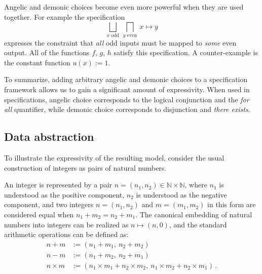 \documentclass[11pt,oneside]{book}
\theoremstyle{definition}
\begin{document}
Angelic and demonic choices become even more powerful
when they are used together.
For example the specification
\[
  \bigsqcup_{x \text{ odd}} \:
  \bigsqcap_{y \text{ even}} \:
  x \mapsto y
\]
expresses the constraint that \emph{all} odd inputs 
must be mapped to \emph{some} even output.
All of the functions $f$, $g$, $h$ satisfy this specification.
A counter-example is the constant function $u(x) := 1$.

To summarize,
adding arbitrary angelic and demonic choices
to a specification framework
allows us to gain a significant amount of expressivity.
When used in specifications,
angelic choice corresponds to
the logical conjunction and the \emph{for all} quantifier,
while demonic choice corresponds to
disjunction and \emph{there exists}.


\subsection{Data abstraction} \label{sec:fspec-ab} %

To illustrate the expressivity of the resulting model,
consider the usual construction of integers
as pairs of natural numbers.

An integer is represented by a pair
$n = (n_1, n_2) \in \mathbb{N} \times \mathbb{N}$,
where
$n_1$ is understood as the positive component,
$n_2$ is understood as the negative component,
and two integers $n = (n_1, n_2)$ and $m = (m_1, m_2)$
in this form
are considered equal when
$n_1 + m_2 = n_2 + m_1$.
The canonical embedding of natural numbers into integers
can be realized as $n \mapsto (n, 0)$, and
the standard arithmetic operations can be defined as:
\begin{align*}
  n + m &:= (n_1 + m_1, \: n_2 + m_2) \\
  n - m &:= (n_1 + m_2, \: n_2 + m_1) \\
  n \times m &:= (n_1 \times m_1 + n_2 \times m_2, \:
    n_1 \times m_2 + n_2 \times m_1)
  \,.
\end{align*}
\end{document}
